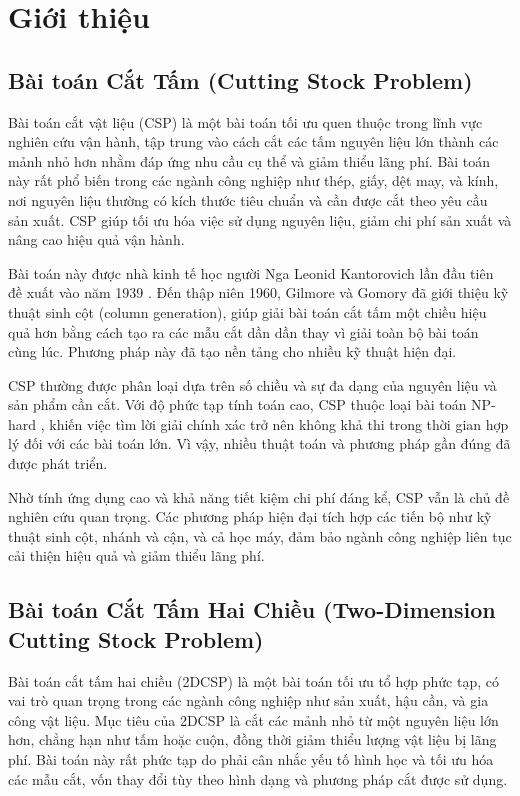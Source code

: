 \section{Giới thiệu}
\subsection{Bài toán Cắt Tấm (Cutting Stock Problem)}

\hspace{0.5cm}Bài toán cắt vật liệu (CSP) là một bài toán tối ưu quen thuộc trong lĩnh vực nghiên cứu vận hành, tập trung vào cách cắt các tấm nguyên liệu lớn thành các mảnh nhỏ hơn nhằm đáp ứng nhu cầu cụ thể và giảm thiểu lãng phí. Bài toán này rất phổ biến trong các ngành công nghiệp như thép, giấy, dệt may, và kính, nơi nguyên liệu thường có kích thước tiêu chuẩn và cần được cắt theo yêu cầu sản xuất. CSP giúp tối ưu hóa việc sử dụng nguyên liệu, giảm chi phí sản xuất và nâng cao hiệu quả vận hành.

Bài toán này được nhà kinh tế học người Nga Leonid Kantorovich lần đầu tiên đề xuất vào năm 1939 \cite{benamor_cutting_2024}. Đến thập niên 1960, Gilmore và Gomory \cite{benamor_cutting_2024} đã giới thiệu kỹ thuật sinh cột (column generation), giúp giải bài toán cắt tấm một chiều hiệu quả hơn bằng cách tạo ra các mẫu cắt dần dần thay vì giải toàn bộ bài toán cùng lúc. Phương pháp này đã tạo nền tảng cho nhiều kỹ thuật hiện đại.

CSP thường được phân loại dựa trên số chiều và sự đa dạng của nguyên liệu và sản phẩm cần cắt. Với độ phức tạp tính toán cao, CSP thuộc loại bài toán NP-hard \cite{IR}, khiến việc tìm lời giải chính xác trở nên không khả thi trong thời gian hợp lý đối với các bài toán lớn. Vì vậy, nhiều thuật toán và phương pháp gần đúng đã được phát triển.

Nhờ tính ứng dụng cao và khả năng tiết kiệm chi phí đáng kể, CSP vẫn là chủ đề nghiên cứu quan trọng. Các phương pháp hiện đại tích hợp các tiến bộ như kỹ thuật sinh cột, nhánh và cận, và cả học máy, đảm bảo ngành công nghiệp liên tục cải thiện hiệu quả và giảm thiểu lãng phí.

\subsection{Bài toán Cắt Tấm Hai Chiều (Two-Dimension Cutting Stock Problem)}

\hspace{0.5cm}Bài toán cắt tấm hai chiều (2DCSP) là một bài toán tối ưu tổ hợp phức tạp, có vai trò quan trọng trong các ngành công nghiệp như sản xuất, hậu cần, và gia công vật liệu. Mục tiêu của 2DCSP là cắt các mảnh nhỏ từ một nguyên liệu lớn hơn, chẳng hạn như tấm hoặc cuộn, đồng thời giảm thiểu lượng vật liệu bị lãng phí. Bài toán này rất phức tạp do phải cân nhắc yếu tố hình học và tối ưu hóa các mẫu cắt, vốn thay đổi tùy theo hình dạng và phương pháp cắt được sử dụng.

